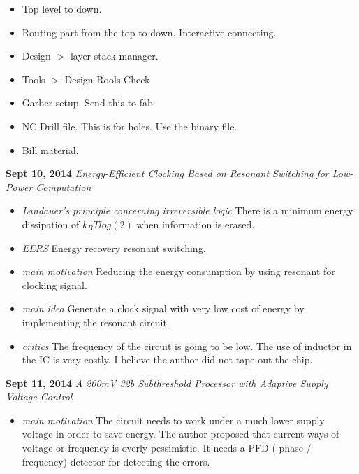 \documentclass[]{article}
\begin{document}
\begin{itemize}
            \item   Top level to down. 
            \item   Routing part from the top to down. Interactive connecting.
            \item   Design $>$ layer stack manager.
            \item   Tools $>$ Design Rools Check
            \item   Garber setup. Send this to fab.
            \item   NC Drill file. This is for holes. Use the binary file.
            \item   Bill material.

            \end{itemize}

\noindent \textbf{ Sept 10, 2014}
\textit{Energy-Efficient Clocking Based on Resonant Switching for Low-Power Computation}
\indent		\begin{itemize}

            \item \textit{Landauer's principle concerning irreversible logic} There is a minimum energy dissipation of $k_{B}Tlog(2)$ when information is erased.
            \item \textit{EERS} Energy recovery resonant switching.    
        
            \item \textit{main motivation} Reducing the energy consumption by using resonant for clocking signal.

            \item \textit{main idea} Generate a clock signal with very low cost of energy by implementing the resonant circuit. 

            \item \textit {critics} The frequency of the circuit is going to be low.
            The use of inductor in the IC is very costly. I believe the author did not tape out the chip.

            \end{itemize}

\noindent \textbf{ Sept 11, 2014}
\textit{A 200mV 32b Subthreshold Processor with Adaptive Supply Voltage Control}
\indent		\begin{itemize}
            \item \textit{main motivation} The circuit needs to work under a much lower supply voltage in order to save energy. 
            The author proposed that current ways of voltage or frequency is overly pessimistic.
            It needs a PFD ( phase / frequency) detector for detecting the errors.

            \end{itemize}
\end{document}
